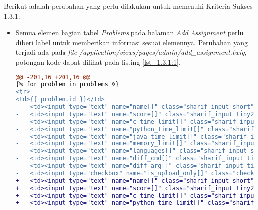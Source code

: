 Berikut adalah perubahan yang perlu dilakukan untuk memenuhi Kriteria Sukses 1.3.1:

\begin{itemize}
	\item Semua elemen bagian tabel \textit{Problems} pada halaman \textit{Add Assignment} perlu diberi label untuk memberikan informasi sesuai elemennya. Perubahan yang terjadi ada pada \textit{file} \textit{/application/views/pages/admin/add\_assignment.twig}, potongan kode dapat dilihat pada listing \ref{lst_1.3.1:1}.
	
\begin{lstlisting}[language=diff, caption=Perubahan pada \textit{file} \textit{add\_assignment.twig}, label=lst_1.3.1:1, basicstyle=\ttfamily, frame=single,
columns=fullflexible, keepspaces=true, breaklines=true]
@@ -201,16 +201,16 @@
{% for problem in problems %}
<tr>
<td>{{ problem.id }}</td>
- 	<td><input type="text" name="name[]" class="sharif_input short" value="{{ problem.name }}"/></td>
- 	<td><input type="text" name="score[]" class="sharif_input tiny2" value="{{ problem.score }}"/></td>
- 	<td><input type="text" name="c_time_limit[]" class="sharif_input tiny2" value="{{ problem.c_time_limit }}"/></td>
- 	<td><input type="text" name="python_time_limit[]" class="sharif_input tiny2" value="{{ problem.python_time_limit }}"/></td>
- 	<td><input type="text" name="java_time_limit[]" class="sharif_input tiny2" value="{{ problem.java_time_limit }}"/></td>
- 	<td><input type="text" name="memory_limit[]" class="sharif_input tiny" value="{{ problem.memory_limit }}"/></td>
- 	<td><input type="text" name="languages[]" class="sharif_input short2" value="{{ problem.allowed_languages }}"/></td>
- 	<td><input type="text" name="diff_cmd[]" class="sharif_input tiny" value="{{ problem.diff_cmd }}"/></td>
- 	<td><input type="text" name="diff_arg[]" class="sharif_input tiny" value="{{ problem.diff_arg }}"/></td>
- 	<td><input type="checkbox" name="is_upload_only[]" class="check" value="{{ problem.id }}" {{ problem.is_upload_only ? 'checked' }}/></td>
+ 	<td><input type="text" name="name[]" class="sharif_input short" value="{{ problem.name }}" aria-label="Problem Name"/></td>
+ 	<td><input type="text" name="score[]" class="sharif_input tiny2" value="{{ problem.score }}" aria-label="Score"/></td>
+ 	<td><input type="text" name="c_time_limit[]" class="sharif_input tiny2" value="{{ problem.c_time_limit }}" aria-label="Time Limit for C"/></td>
+ 	<td><input type="text" name="python_time_limit[]" class="sharif_input tiny2" value="{{ problem.python_time_limit }}" aria-label="Time Limit for Python"/></td>

\end{lstlisting}
\end{itemize}
